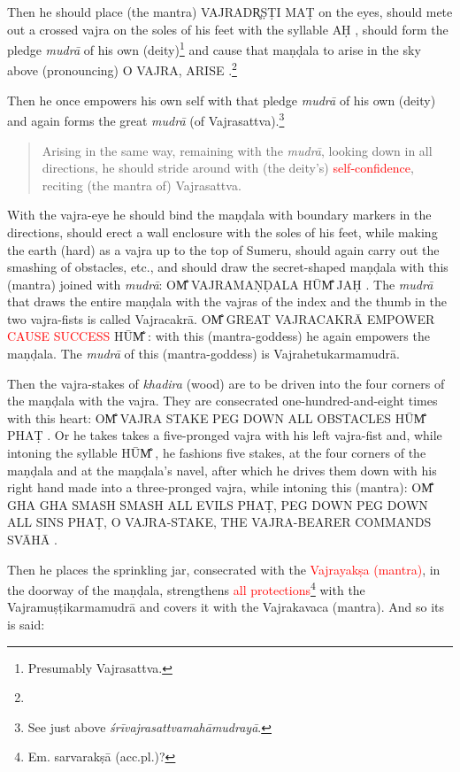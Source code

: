 \documentclass[11pt]{book}
\makeatletter
\def\fakesc#1{%
  \begingroup%
  \xdef\fake@name{\csname\curr@fontshape/\f@size\endcsname}%
  \fontsize{1.3\fontdimen8\fake@name}{\baselineskip}\selectfont%
  \uppercase{#1}%
  \endgroup%
}
\newcommand{\mantra}[1]{\fakesc{#1}}
\newcommand{\red}[1]{\textcolor{red}{#1}}
\newcommand{\skt}[1]{\emph{#1}}
\makeatother
\begin{document}
Then he should place (the mantra) \mantra{vajradr̥ṣṭi maṭ} on the eyes, should mete out a crossed vajra on the soles of his feet with the syllable \mantra{aḥ}, should form the pledge \skt{mudrā} of his own (deity)\footnote{Presumably Vajrasattva.} and cause that maṇḍala to arise in the sky above (pronouncing) \mantra{o vajra, arise}.\footnote{}\par

Then he once empowers his own self with that pledge \skt{mudrā} of his own (deity) and again forms the great \skt{mudrā} (of Vajrasattva).\footnote{See just above \skt{śrīvajrasattvamahāmudrayā}.}

\begin{verse}
Arising in the same way, remaining with the \skt{mudrā}, looking down in all directions, he should stride around with (the deity's) \red{self-confidence}, reciting (the mantra of) Vajrasattva.
\end{verse}

\noindent With the vajra-eye he should bind the maṇḍala with boundary markers in the directions, should erect a wall enclosure with the soles of his feet, while making the earth (hard) as a vajra up to the top of Sumeru, should again carry out the smashing of obstacles, etc., and should draw the secret-shaped maṇḍala with this (mantra) joined with \skt{mudrā}: \mantra{om̐ vajramaṇḍala hūm̐ jaḥ}. The \skt{mudrā} that draws the entire maṇḍala with the vajras of the index and the thumb in the two vajra-fists is called Vajracakrā. \mantra{om̐ great vajracakrā empower \red{cause success}%
 hūm̐}: with this (mantra-goddess) he again empowers the maṇḍala. The \skt{mudrā} of this (mantra-goddess) is Vajrahetukarmamudrā.

Then the vajra-stakes of \skt{khadira} (wood) are to be driven into the four corners of the maṇḍala with the vajra. They are consecrated one-hundred-and-eight times with this heart: \mantra{om̐ vajra stake peg down all obstacles hūm̐ phaṭ}. Or he takes takes a five-pronged vajra with his left vajra-fist and, while intoning the syllable \mantra{hūm̐}, he fashions five stakes, at the four corners of the maṇḍala and at the maṇḍala's navel, after which he drives them down with his right hand made into a three-pronged vajra, while intoning this (mantra): \mantra{om̐ gha gha smash smash all evils phaṭ, peg down peg down all sins phaṭ, o vajra-stake, the Vajra-bearer commands svāhā}.

Then he places the sprinkling jar, consecrated with the \red{Vajrayakṣa (mantra)}, in the doorway of the maṇḍala, strengthens \red{all protections}\footnote{Em. sarvarakṣā (acc.pl.)?} with the Vajramuṣṭikarmamudrā and covers it with the Vajrakavaca (mantra). And so its is said:
\end{document}
